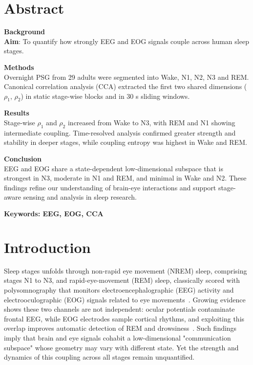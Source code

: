 



\maketitle

\section{Abstract}

\textbf{Background}\\
\textbf{Aim}: To quantify how strongly EEG and EOG signals couple across human sleep stages.

\textbf{Methods}\\
Overnight PSG from 29 adults were segmented into Wake, N1, N2, N3 and REM. Canonical correlation analysis (CCA) extracted the first two shared dimensions ($\rho_1$, $\rho_2$) in static stage-wise blocks and in 30 s sliding windows.

\textbf{Results}\\
Stage-wise $\rho_1$ and $\rho_2$ increased from Wake to N3, with REM and N1 showing intermediate coupling. Time-resolved analysis confirmed greater strength and stability in deeper stages, while coupling entropy was highest in Wake and REM.

\textbf{Conclusion}\\
EEG and EOG share a state-dependent low-dimensional subspace that is strongest in N3, moderate in N1 and REM, and minimal in Wake and N2. These findings refine our understanding of brain-eye interactions and support stage-aware sensing and analysis in sleep research.

\textbf{Keywords: EEG, EOG, CCA}

\section{Introduction}

Sleep stages unfolds through non-rapid eye movement (NREM) sleep, comprising stages N1 to N3, and rapid-eye-movement (REM) sleep, classically scored with polysomnography that monitors electroencephalographic (EEG) activity and electrooculographic (EOG) signals related to eye movements~\cite{liu2021}. Growing evidence shows these two channels are not independent: ocular potentials contaminate frontal EEG, while EOG electrodes sample cortical rhythms, and exploiting this overlap improves automatic detection of REM and drowsiness~\cite{xu2025, safieddine2012}. Such findings imply that brain and eye signals cohabit a low-dimensional "communication subspace" whose geometry may vary with different state. Yet the strength and dynamics of this coupling across all stages remain unquantified.

